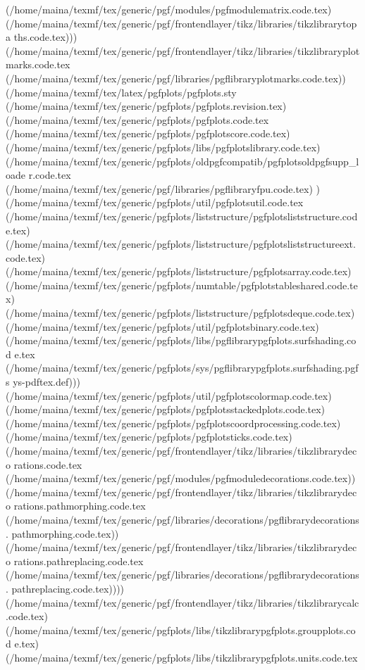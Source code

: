 \begin{center}
\begin{center}
{{(/home/maina/texmf/tex/generic/pgf/modules/pgfmodulematrix.code.tex)
(/home/maina/texmf/tex/generic/pgf/frontendlayer/tikz/libraries/tikzlibrarytopa
ths.code.tex)))
(/home/maina/texmf/tex/generic/pgf/frontendlayer/tikz/libraries/tikzlibraryplot
marks.code.tex
(/home/maina/texmf/tex/generic/pgf/libraries/pgflibraryplotmarks.code.tex))
(/home/maina/texmf/tex/latex/pgfplots/pgfplots.sty
(/home/maina/texmf/tex/generic/pgfplots/pgfplots.revision.tex)
(/home/maina/texmf/tex/generic/pgfplots/pgfplots.code.tex
(/home/maina/texmf/tex/generic/pgfplots/pgfplotscore.code.tex)
(/home/maina/texmf/tex/generic/pgfplots/libs/pgfplotslibrary.code.tex)
(/home/maina/texmf/tex/generic/pgfplots/oldpgfcompatib/pgfplotsoldpgfsupp_loade
r.code.tex (/home/maina/texmf/tex/generic/pgf/libraries/pgflibraryfpu.code.tex)
) (/home/maina/texmf/tex/generic/pgfplots/util/pgfplotsutil.code.tex
(/home/maina/texmf/tex/generic/pgfplots/liststructure/pgfplotsliststructure.cod
e.tex)
(/home/maina/texmf/tex/generic/pgfplots/liststructure/pgfplotsliststructureext.
code.tex)
(/home/maina/texmf/tex/generic/pgfplots/liststructure/pgfplotsarray.code.tex)
(/home/maina/texmf/tex/generic/pgfplots/numtable/pgfplotstableshared.code.tex)
(/home/maina/texmf/tex/generic/pgfplots/liststructure/pgfplotsdeque.code.tex)
(/home/maina/texmf/tex/generic/pgfplots/util/pgfplotsbinary.code.tex)
(/home/maina/texmf/tex/generic/pgfplots/libs/pgflibrarypgfplots.surfshading.cod
e.tex
(/home/maina/texmf/tex/generic/pgfplots/sys/pgflibrarypgfplots.surfshading.pgfs
ys-pdftex.def)))
(/home/maina/texmf/tex/generic/pgfplots/util/pgfplotscolormap.code.tex)
(/home/maina/texmf/tex/generic/pgfplots/pgfplotsstackedplots.code.tex)
(/home/maina/texmf/tex/generic/pgfplots/pgfplotscoordprocessing.code.tex)
(/home/maina/texmf/tex/generic/pgfplots/pgfplotsticks.code.tex)
(/home/maina/texmf/tex/generic/pgf/frontendlayer/tikz/libraries/tikzlibrarydeco
rations.code.tex
(/home/maina/texmf/tex/generic/pgf/modules/pgfmoduledecorations.code.tex))
(/home/maina/texmf/tex/generic/pgf/frontendlayer/tikz/libraries/tikzlibrarydeco
rations.pathmorphing.code.tex
(/home/maina/texmf/tex/generic/pgf/libraries/decorations/pgflibrarydecorations.
pathmorphing.code.tex))
(/home/maina/texmf/tex/generic/pgf/frontendlayer/tikz/libraries/tikzlibrarydeco
rations.pathreplacing.code.tex
(/home/maina/texmf/tex/generic/pgf/libraries/decorations/pgflibrarydecorations.
pathreplacing.code.tex))))
(/home/maina/texmf/tex/generic/pgf/frontendlayer/tikz/libraries/tikzlibrarycalc
.code.tex)
(/home/maina/texmf/tex/generic/pgfplots/libs/tikzlibrarypgfplots.groupplots.cod
e.tex)
(/home/maina/texmf/tex/generic/pgfplots/libs/tikzlibrarypgfplots.units.code.tex
}}
\end{center}
\end{center}
